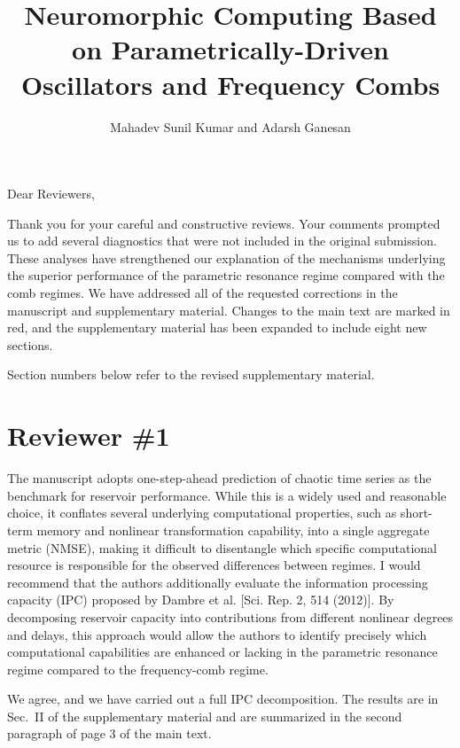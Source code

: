 \documentclass{ar2rc}
\title{Neuromorphic Computing Based on Parametrically-Driven \\Oscillators and Frequency Combs}
\author{Mahadev Sunil Kumar and Adarsh Ganesan}
\begin{document}
\maketitle

Dear Reviewers,

Thank you for your careful and constructive reviews. Your comments prompted us to add several diagnostics that were not included in the original submission. These analyses have strengthened our explanation of the mechanisms underlying the superior performance of the parametric resonance regime compared with the comb regimes. We have addressed all of the requested corrections in the manuscript and supplementary material. Changes to the main text are marked in red, and the supplementary material has been expanded to include eight new sections.

Section numbers below refer to the revised supplementary material.

\newpage

\section{Reviewer \#1}
\RC \label{rev:1.1}The manuscript adopts one-step-ahead prediction of chaotic time series as the benchmark for reservoir performance. While this is a widely used and reasonable choice, it conflates several underlying computational properties, such as short-term memory and nonlinear transformation capability, into a single aggregate metric (NMSE), making it difficult to disentangle which specific computational resource is responsible for the observed differences between regimes. I would recommend that the authors additionally evaluate the information processing capacity (IPC) proposed by Dambre et al. [Sci. Rep. 2, 514 (2012)]. By decomposing reservoir capacity into contributions from different nonlinear degrees and delays, this approach would allow the authors to identify precisely which computational capabilities are enhanced or lacking in the parametric resonance regime compared to the frequency-comb regime.

\AR We agree, and we have carried out a full IPC decomposition. The results are in Sec.~II of the supplementary material and are summarized in the second paragraph of page 3 of the main text.
\end{document}
